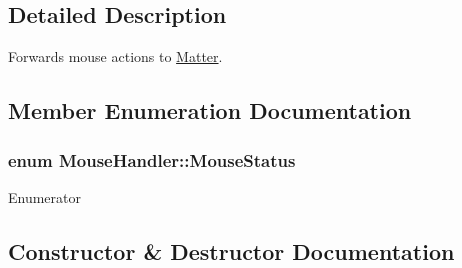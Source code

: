 \subsection{Detailed Description}
Forwards mouse actions to \hyperlink{classMatter}{Matter}. 

\subsection{Member Enumeration Documentation}
\hypertarget{classMouseHandler_af967315727aa1d435d55cc704e64fd1a}{}
\subsubsection[{Mouse\+Status}]{\setlength{\rightskip}{0pt plus 5cm}enum {\bf Mouse\+Handler\+::\+Mouse\+Status}}\label{classMouseHandler_af967315727aa1d435d55cc704e64fd1a}
\begin{Desc}
\item[Enumerator]\par
\begin{description}
\item[{\em 
\hypertarget{classMouseHandler_af967315727aa1d435d55cc704e64fd1aa5aba71e1304fdbe0f2899b6b1345d74a}{}M\+O\+U\+S\+E\+\_\+\+F\+R\+E\+E\label{classMouseHandler_af967315727aa1d435d55cc704e64fd1aa5aba71e1304fdbe0f2899b6b1345d74a}
}]\item[{\em 
\hypertarget{classMouseHandler_af967315727aa1d435d55cc704e64fd1aa440928d86f44f388601ede4e6b91df76}{}M\+O\+U\+S\+E\+\_\+\+P\+U\+T\+T\+I\+N\+G\label{classMouseHandler_af967315727aa1d435d55cc704e64fd1aa440928d86f44f388601ede4e6b91df76}
}]\end{description}
\end{Desc}


\subsection{Constructor \& Destructor Documentation}
\hypertarget{classMouseHandler_a2c79a128cb7e48f556cb228a3b14f291}{}
